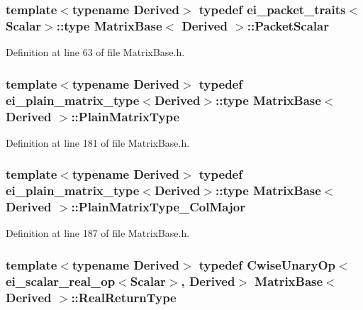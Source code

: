 \hypertarget{class_matrix_base_a58f32cd6a06433ee7a60efa03e99183a}{
\subsubsection[{Packet\-Scalar}]{\setlength{\rightskip}{0pt plus 5cm}template$<$typename Derived$>$ typedef {\bf ei\-\_\-packet\-\_\-traits}$<${\bf Scalar}$>$\-::{\bf type} {\bf Matrix\-Base}$<$ Derived $>$\-::{\bf Packet\-Scalar}}}\label{class_matrix_base_a58f32cd6a06433ee7a60efa03e99183a}


Definition at line 63 of file Matrix\-Base.\-h.

\hypertarget{class_matrix_base_aa6a23b3d1aac2a1b4b9d8bcb54e1e2bc}{
\subsubsection[{Plain\-Matrix\-Type}]{\setlength{\rightskip}{0pt plus 5cm}template$<$typename Derived$>$ typedef {\bf ei\-\_\-plain\-\_\-matrix\-\_\-type}$<$Derived$>$\-::{\bf type} {\bf Matrix\-Base}$<$ Derived $>$\-::{\bf Plain\-Matrix\-Type}}}\label{class_matrix_base_aa6a23b3d1aac2a1b4b9d8bcb54e1e2bc}


Definition at line 181 of file Matrix\-Base.\-h.

\hypertarget{class_matrix_base_ac3f83c75b9153e7b49ea42f15325aa34}{
\subsubsection[{Plain\-Matrix\-Type\-\_\-\-Col\-Major}]{\setlength{\rightskip}{0pt plus 5cm}template$<$typename Derived$>$ typedef {\bf ei\-\_\-plain\-\_\-matrix\-\_\-type}$<$Derived$>$\-::{\bf type} {\bf Matrix\-Base}$<$ Derived $>$\-::{\bf Plain\-Matrix\-Type\-\_\-\-Col\-Major}}}\label{class_matrix_base_ac3f83c75b9153e7b49ea42f15325aa34}


Definition at line 187 of file Matrix\-Base.\-h.

\hypertarget{class_matrix_base_a02863bf8c3ddaf96fda6491811c3ec96}{
\subsubsection[{Real\-Return\-Type}]{\setlength{\rightskip}{0pt plus 5cm}template$<$typename Derived$>$ typedef {\bf Cwise\-Unary\-Op}$<${\bf ei\-\_\-scalar\-\_\-real\-\_\-op}$<${\bf Scalar}$>$, Derived$>$ {\bf Matrix\-Base}$<$ Derived $>$\-::{\bf Real\-Return\-Type}}}\label{class_matrix_base_a02863bf8c3ddaf96fda6491811c3ec96}


